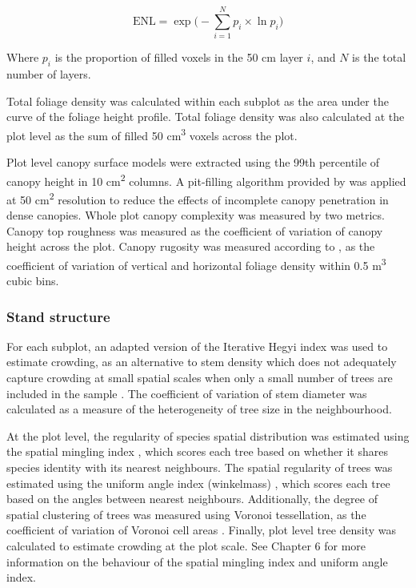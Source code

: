 \documentclass[11pt,a4paper]{article}
\begin{document}
\begin{equation}
	\text{ENL} = \exp\Big(-\sum_{i=1}^{N} p_{i} \times \ln p_{i} \Big)
\end{equation}

Where $p_{i}$ is the proportion of filled voxels in the 50 cm layer $i$, and $N$ is the total number of layers. 

Total foliage density was calculated within each subplot as the area under the curve of the foliage height profile. Total foliage density was also calculated at the plot level as the sum of filled 50 cm\textsuperscript{3} voxels across the plot.

Plot level canopy surface models were extracted using the 99th percentile of canopy height in 10 cm\textsuperscript{2} columns. A pit-filling algorithm provided by \citet{Khosravipour2014} was applied at 50 cm\textsuperscript{2} resolution to reduce the effects of incomplete canopy penetration in dense canopies. Whole plot canopy complexity was measured by two metrics. Canopy top roughness was measured as the coefficient of variation of canopy height across the plot. Canopy rugosity was measured according to \citet{Hardiman2011}, as the coefficient of variation of vertical and horizontal foliage density within 0.5 m\textsuperscript{3} cubic bins. 

\subsubsection{Stand structure}

For each subplot, an adapted version of the Iterative Hegyi index was used to estimate crowding, as an alternative to stem density which does not adequately capture crowding at small spatial scales when only a small number of trees are included in the sample \citep{Hegyi1974}. The coefficient of variation of stem diameter was calculated as a measure of the heterogeneity of tree size in the neighbourhood. 

At the plot level, the regularity of species spatial distribution was estimated using the spatial mingling index \citep{Gadow2002}, which scores each tree based on whether it shares species identity with its nearest neighbours. The spatial regularity of trees was estimated using the uniform angle index (winkelmass) \citep{Gadow2002}, which scores each tree based on the angles between nearest neighbours. Additionally, the degree of spatial clustering of trees was measured using Voronoi tessellation, as the coefficient of variation of Voronoi cell areas \citep{Ong2012}. Finally, plot level tree density was calculated to estimate crowding at the plot scale. See Chapter 6 for more information on the behaviour of the spatial mingling index and uniform angle index.
\end{document}
